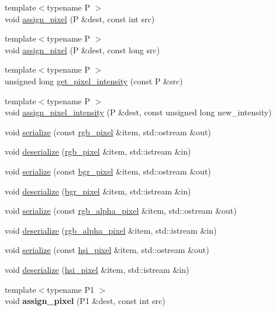 \begin{DoxyCompactItemize}
\item 
{\footnotesize template$<$typename P $>$ }\\void \hyperlink{namespacedlib_a88c00fa9d7ea718f6198c72451378f2a}{assign\_\-pixel} (P \&dest, const int src)
\item 
{\footnotesize template$<$typename P $>$ }\\void \hyperlink{namespacedlib_a5756e98c19859a24eb42d6b906808095}{assign\_\-pixel} (P \&dest, const long src)
\item 
{\footnotesize template$<$typename P $>$ }\\unsigned long \hyperlink{namespacedlib_acadbad5cd1cbaf9f188eb56b518a0f01}{get\_\-pixel\_\-intensity} (const P \&src)
\item 
{\footnotesize template$<$typename P $>$ }\\void \hyperlink{namespacedlib_a3b9a3281788e2c68adbe5e81265aaeb2}{assign\_\-pixel\_\-intensity} (P \&dest, const unsigned long new\_\-intensity)
\item 
void \hyperlink{namespacedlib_ac78b72e65600a0d25ac3224539794fc2}{serialize} (const \hyperlink{structdlib_1_1rgb__pixel}{rgb\_\-pixel} \&item, std::ostream \&out)
\item 
void \hyperlink{namespacedlib_a5e5ead1e1179ca255a628e46a55d12ce}{deserialize} (\hyperlink{structdlib_1_1rgb__pixel}{rgb\_\-pixel} \&item, std::istream \&in)
\item 
void \hyperlink{namespacedlib_aefd5ce982b258dc62d2c4a657278a492}{serialize} (const \hyperlink{structdlib_1_1bgr__pixel}{bgr\_\-pixel} \&item, std::ostream \&out)
\item 
void \hyperlink{namespacedlib_a2ffefe1102a7c709e26a23b4f2c7668c}{deserialize} (\hyperlink{structdlib_1_1bgr__pixel}{bgr\_\-pixel} \&item, std::istream \&in)
\item 
void \hyperlink{namespacedlib_abbbd5224f9387eef940579cdf3fd4a13}{serialize} (const \hyperlink{structdlib_1_1rgb__alpha__pixel}{rgb\_\-alpha\_\-pixel} \&item, std::ostream \&out)
\item 
void \hyperlink{namespacedlib_a59df13454703d695429ac5af04c8cb35}{deserialize} (\hyperlink{structdlib_1_1rgb__alpha__pixel}{rgb\_\-alpha\_\-pixel} \&item, std::istream \&in)
\item 
void \hyperlink{namespacedlib_add718e65e3023a2abd8eb04200e81b52}{serialize} (const \hyperlink{structdlib_1_1hsi__pixel}{hsi\_\-pixel} \&item, std::ostream \&out)
\item 
void \hyperlink{namespacedlib_a5291c6d8fcf1bd624eaa7f908ea137bf}{deserialize} (\hyperlink{structdlib_1_1hsi__pixel}{hsi\_\-pixel} \&item, std::istream \&in)
\item 
\hypertarget{namespacedlib_a21491eceab973e1bd6efb6730dfdc890}{
{\footnotesize template$<$typename P1 $>$ }\\void {\bfseries assign\_\-pixel} (P1 \&dest, const int src)}
\label{namespacedlib_a21491eceab973e1bd6efb6730dfdc890}


\end{DoxyCompactItemize}
